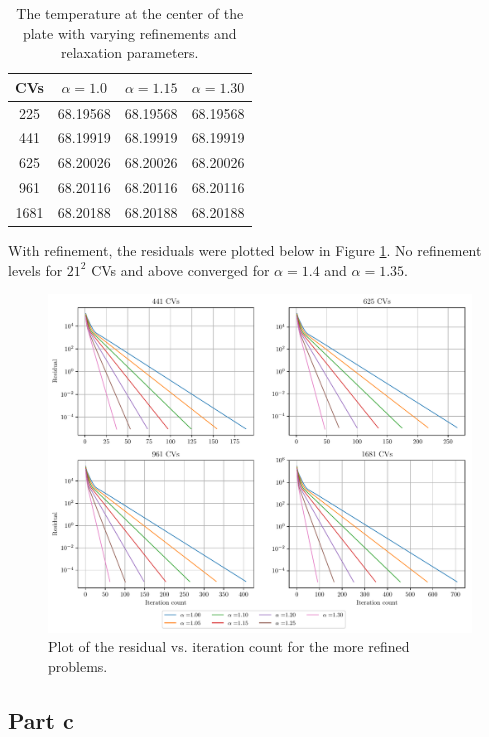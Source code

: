 \documentclass{article}
\begin{document}
\def\arraystretch{1.3}
\begin{table}[H]
	\small
	\centering
	\caption{The temperature at the center of the plate with varying refinements and relaxation parameters.}
	\vspace{0.2cm}
	\begin{tabular}{c|c|c|c}
		\hline
		CVs & $\alpha = 1.0$ & $\alpha = 1.15$ & $\alpha = 1.30$ \\     
		\hline
		225  & 68.19568 & 68.19568 & 68.19568 \\
		441  & 68.19919 & 68.19919 & 68.19919 \\
		625  & 68.20026 & 68.20026 & 68.20026 \\
		961  & 68.20116 & 68.20116 & 68.20116 \\
		1681 & 68.20188 & 68.20188 & 68.20188
	\end{tabular}
	\label{table:b-temps}
\end{table}

With refinement, the residuals were plotted below in Figure \ref{fig:b-iterations}. No refinement levels for $21^2$ CVs and above converged for $\alpha = 1.4$ and $\alpha = 1.35$.

\begin{figure}[H]
	\centering
	\includegraphics[width=\linewidth]{../results/b-iterations}
	\caption{Plot of the residual vs. iteration count for the more refined problems.}
	\label{fig:b-iterations}
\end{figure}

\subsection*{Part c}
\end{document}
